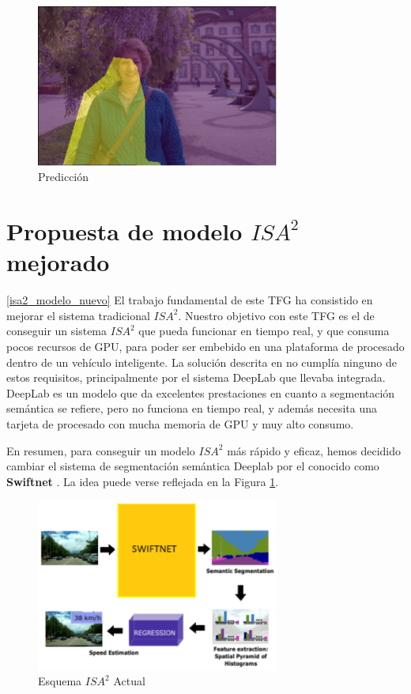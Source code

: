 \begin{figure}[H]
  \centering
  \includegraphics[width=8cm]{Figuras/IoU_2.eps}
  \caption{Predicción}
\end{figure}

\section{Propuesta de modelo $ISA^{2}$ mejorado}
\ref{isa2_modelo_nuevo}
El trabajo fundamental de este TFG ha consistido en mejorar el sistema tradicional $ISA^{2}$. Nuestro objetivo con este TFG es el de conseguir un sistema $ISA^{2}$  que pueda funcionar en tiempo real, y que consuma pocos recursos de GPU, para poder ser embebido en una plataforma de procesado dentro de un vehículo inteligente. La solución descrita en \cite{isa2} no cumplía ninguno de estos requisitos, principalmente por el sistema DeepLab que llevaba integrada. DeepLab es un modelo que da excelentes prestaciones en cuanto a segmentación semántica se refiere, pero no funciona en tiempo real, y además necesita una tarjeta de procesado con mucha memoria de GPU y muy alto consumo.


En resumen, para conseguir un modelo $ISA^{2}$ más rápido y eficaz, hemos decidido cambiar el sistema de segmentación semántica Deeplab por el conocido como \textbf{Swiftnet} \cite{swiftnet}. La idea puede verse reflejada en la Figura \ref{fig:Isa_v2}.

\begin{figure}[H]
  \centering
  \includegraphics[width=8cm]{Figuras/Figura_Esquema_ISA2_Version_2.eps}
  \caption{Esquema $ISA^{2}$ Actual}
    \label{fig:Isa_v2}
\end{figure}


